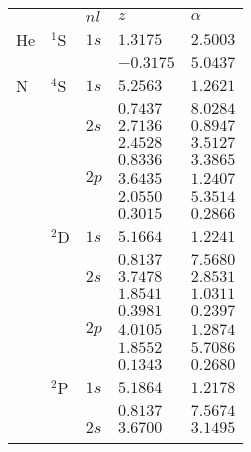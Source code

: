 \begin{table}
\begin{center}
\begin{tabularx}{\textwidth}{
>{\centering\arraybackslash}p{}
>{\centering\arraybackslash}p{}
>{\centering\arraybackslash}p{}
>{\centering\arraybackslash}p{}
>{\centering\arraybackslash}p{}}
\rowcolor{mydarkgray} 
   &       & $nl$ & $z$        & $\alpha$   \\
He & $^1$S & $1s$ &  $1.3175$ & $2.5003$  \\\rowcolor{mygray} 
   &       &      & $-0.3175$ & $5.0437$  \\ 
N  & $^4$S & $1s$ & $5.2563$ & $1.2621$  \\\rowcolor{mygray} 
   &       &      & $0.7437$ & $8.0284$  \\ 
   &       & $2s$ & $2.7136$ & $0.8947$ \\\rowcolor{mygray} 
   &       &      & $2.4528$ & $3.5127$  \\
   &       &      & $0.8336$ & $3.3865$  \\ \rowcolor{mygray} 
   &       & $2p$ & $3.6435$ & $1.2407$  \\ 
   &       &      & $2.0550$ & $5.3514$  \\\rowcolor{mygray} 
   &       &      & $0.3015$ & $0.2866$ \\
   & $^2$D & $1s$ & $5.1664$ & $1.2241$  \\\rowcolor{mygray} 
   &       &      & $0.8137$ & $7.5680$  \\ 
   &       & $2s$ & $3.7478$ & $2.8531$  \\\rowcolor{mygray} 
   &       &      & $1.8541$ & $1.0311$  \\ 
   &       &      & $0.3981$ & $0.2397$ \\\rowcolor{mygray} 
   &       & $2p$ & $4.0105$ & $1.2874$  \\ 
   &       &      & $1.8552$ & $5.7086$  \\\rowcolor{mygray} 
   &       &      & $0.1343$ & $0.2680$ \\
   & $^2$P & $1s$ & $5.1864$ & $1.2178$  \\\rowcolor{mygray} 
   &       &      & $0.8137$ & $7.5674$  \\ 
   &       & $2s$ & $3.6700$ & $3.1495$  \\\rowcolor{mygray} 

\end{tabularx}
\end{center}
\end{table}
